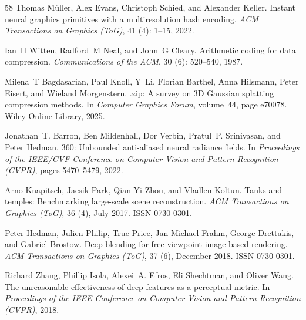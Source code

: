 \documentclass{article}
\begin{document}
\begin{thebibliography}{58}
Thomas M{\"u}ller, Alex Evans, Christoph Schied, and Alexander Keller.
\newblock Instant neural graphics primitives with a multiresolution hash
  encoding.
\newblock \emph{ACM Transactions on Graphics (ToG)}, 41 (4):
  1--15, 2022.

Ian~H Witten, Radford~M Neal, and John~G Cleary.
\newblock Arithmetic coding for data compression.
\newblock \emph{Communications of the ACM}, 30 (6): 520--540,
  1987.

Milena~T Bagdasarian, Paul Knoll, Y~Li, Florian Barthel, Anna Hilsmann, Peter
  Eisert, and Wieland Morgenstern.
.zip: A survey on 3{D} {G}aussian splatting compression
  methods.
\newblock In \emph{Computer Graphics Forum}, volume~44, page e70078. Wiley
  Online Library, 2025.

Jonathan~T. Barron, Ben Mildenhall, Dor Verbin, Pratul~P. Srinivasan, and Peter
  Hedman.
 360: {U}nbounded anti-aliased neural radiance fields.
\newblock In \emph{Proceedings of the IEEE/CVF Conference on Computer Vision
  and Pattern Recognition (CVPR)}, pages 5470--5479, 2022.

Arno Knapitsch, Jaesik Park, Qian-Yi Zhou, and Vladlen Koltun.
\newblock Tanks and temples: {B}enchmarking large-scale scene reconstruction.
\newblock \emph{ACM Transactions on Graphics (ToG)}, 36 (4), July
  2017.
\newblock ISSN 0730-0301.

Peter Hedman, Julien Philip, True Price, Jan-Michael Frahm, George Drettakis,
  and Gabriel Brostow.
\newblock Deep blending for free-viewpoint image-based rendering.
\newblock \emph{ACM Transactions on Graphics (ToG)}, 37 (6), December
  2018.
\newblock ISSN 0730-0301.

Richard Zhang, Phillip Isola, Alexei~A. Efros, Eli Shechtman, and Oliver Wang.
\newblock The unreasonable effectiveness of deep features as a perceptual
  metric.
\newblock In \emph{Proceedings of the IEEE Conference on Computer Vision and
  Pattern Recognition (CVPR)}, 2018.


\end{thebibliography}
\end{document}
